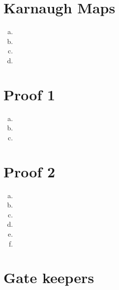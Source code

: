 \documentclass{article}
\begin{document}
\section{Karnaugh Maps}
\begin{enumerate}[(a)]
    \item
    \item
    \item
    \item
\end{enumerate}




\section{Proof 1}
\begin{enumerate}[(a)]
    \item
    \item
    \item
\end{enumerate}




\section{Proof 2}
\begin{enumerate}[(a)]
    \item
    \item
    \item
    \item
    \item
    \item
\end{enumerate}




\section{Gate keepers}





\end{document}
